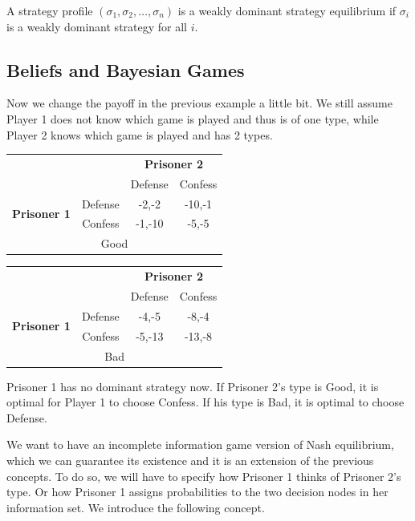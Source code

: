 \documentclass[12pt, oneside]{article}
\begin{document}
A strategy profile \((\sigma_1, \sigma_2, \dots, \sigma_n)\) is a weakly dominant strategy equilibrium if \(\sigma_i\) is a weakly dominant strategy for all \(i\).

\subsection{Beliefs and Bayesian Games}
Now we change the payoff in the previous example a little bit. We still assume Player 1 does not know which game is played and thus is of one type, while Player 2 knows which game is played and has 2 types.

\begin{table}[h]
    \renewcommand{\arraystretch}{1.2}
    \setlength{\tabcolsep}{8pt}
    \begin{tabular}{c c|c c|}
        \multicolumn{2}{c}{} & \multicolumn{2}{c}{\textbf{Prisoner 2}} \\
        \multicolumn{2}{c}{} & Defense & Confess \\
        \cline{2-4}
        \multirow{2}{*}{\textbf{Prisoner 1}} & Defense & -2,-2 & -10,-1 \\
        & Confess & -1,-10 & -5,-5 \\
        \cline{2-4}
        \multicolumn{4}{c}{Good}
    \end{tabular}
    \hspace{1cm}
    \begin{tabular}{c c|c c|}
        \multicolumn{2}{c}{} & \multicolumn{2}{c}{\textbf{Prisoner 2}} \\
        \multicolumn{2}{c}{} & Defense & Confess \\
        \cline{2-4}
        \multirow{2}{*}{\textbf{Prisoner 1}} & Defense & -4,-5 & -8,-4 \\
        & Confess & -5,-13 & -13,-8 \\
        \cline{2-4}
        \multicolumn{4}{c}{Bad}
    \end{tabular}
\end{table}

Prisoner 1 has no dominant strategy now. If Prisoner 2's type is Good, it is optimal for Player 1 to choose Confess. If his type is Bad, it is optimal to choose Defense.

We want to have an incomplete information game version of Nash equilibrium, which we can guarantee its existence and it is an extension of the previous concepts. To do so, we will have to specify how Prisoner 1 thinks of Prisoner 2's type. Or how Prisoner 1 assigns probabilities to the two decision nodes in her information set. We introduce the following concept.
\end{document}
